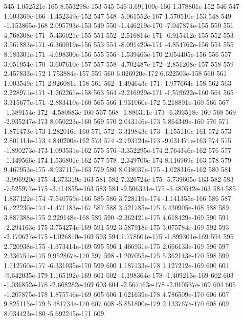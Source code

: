 \documentclass{article}
\begin{document}
\begin{Schunk}
\begin{Soutput}
545   1.052521e-165  8.553298e-153  545
546   3.691100e-166  1.378801e-152  546
547   1.603369e-166 -1.452349e-152  547
548  -5.061552e-167  1.570510e-153  548
549  -1.153865e-168  2.095793e-153  549
550  -1.446219e-170 -7.047874e-155  550
551   4.768308e-171 -5.436021e-155  551
552  -2.516814e-171 -6.915412e-155  552
553   3.561883e-171 -6.360019e-156  553
554  -8.091420e-171 -4.854762e-156  554
555   8.183301e-171 -4.698300e-156  555
556  -1.539463e-170  2.054405e-156  556
557   3.051954e-170 -3.607610e-157  557
558  -4.702487e-172 -2.851268e-157  558
559   2.457833e-172  1.753884e-157  559
560   6.026920e-172  6.622503e-158  560
561   1.003549e-171  2.926081e-158  561
562  -1.494643e-171 -1.977664e-158  562
563   2.228971e-171 -1.262267e-158  563
564  -2.216929e-171 -1.579622e-160  564
565   3.315677e-171 -2.883410e-160  565
566   1.931060e-172  5.218891e-160  566
567  -1.389154e-172 -4.580883e-160  567
568  -1.886311e-173 -6.393518e-160  568
569  -2.935247e-173  8.050223e-160  569
570   2.043146e-173  5.864349e-160  570
571   1.871473e-173  1.282016e-160  571
572  -3.319843e-173 -1.155110e-161  572
573   2.801114e-173  4.840200e-162  573
574  -2.793124e-173 -9.031471e-163  574
575  -1.890273e-173  1.093531e-162  575
576  -3.352295e-174  2.764346e-162  576
577  -1.149566e-174  1.536801e-162  577
578  -2.349706e-174  8.116969e-163  578
579   9.467953e-175 -8.937117e-163  579
580   8.018037e-175 -1.028316e-162  580
581  -3.996920e-175 -4.373319e-163  581
582   7.326724e-175 -5.739605e-163  582
583  -7.525977e-175 -3.414855e-163  583
584  -9.506331e-175 -3.480542e-163  584
585   1.837122e-174 -7.540759e-166  585
586   3.728119e-174 -1.141355e-166  586
587   6.722230e-174 -1.471183e-167  587
588   3.521785e-175  6.430905e-168  588
589   3.887388e-175  2.229148e-168  589
590  -2.362421e-175  4.618429e-169  590
591  -2.294163e-175  3.754274e-169  591
592   3.587918e-175  3.075784e-169  592
593  -2.170627e-175 -4.026810e-169  593
594   1.778601e-175 -1.899301e-169  594
595   2.720938e-175 -1.373414e-169  595
596   1.466931e-175  2.666133e-169  596
597   2.336751e-175  9.952867e-170  597
598  -1.207055e-175  5.362143e-170  598
599   1.712760e-177 -6.331035e-170  599
600   1.187133e-178  1.127212e-169  600
601  -9.642035e-179  1.165192e-169  601
602  -1.198364e-178 -1.409213e-169  602
603  -1.036852e-178 -2.668282e-169  603
604  -2.567463e-178 -2.010537e-169  604
605  -1.207875e-178  1.875746e-169  605
606   1.621639e-178  4.786509e-170  606
607   9.825115e-179  5.481734e-170  607
608  -5.851800e-179  2.133767e-170  608
609   8.034423e-180 -5.692245e-171  609

\end{Soutput}
\end{Schunk}
\end{document}
